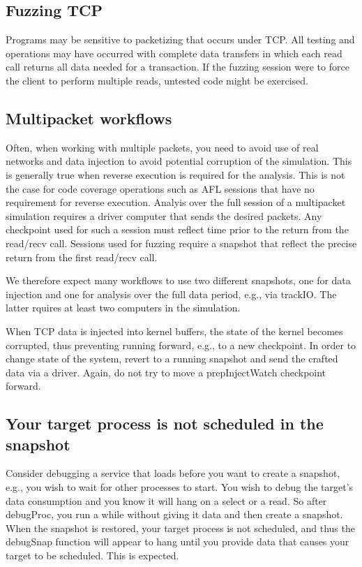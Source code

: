 \documentclass[titlepage]{article}
\begin{document}
\begin{appendices}
\subsection{Fuzzing TCP}
Programs may be sensitive to packetizing that occurs under TCP.  All testing and operations may have occurred with
complete data transfers in which each read call returns all data needed for a transaction.  If the fuzzing session
were to force the client to perform multiple reads, untested code might be exercised.

\subsection{Multipacket workflows}
Often, when working with multiple packets, you need to avoid use of real networks and data injection to avoid potential corruption of the simulation.
This is generally true when reverse execution is required for the analysis.  This is not the case for code coverage operations such as AFL sessions that
have no requirement for reverse execution.  Analyis over the full session of a multipacket simulation requires a driver computer that sends the desired
packets.  Any checkpoint used for such a session must reflect time prior to the return from the read/recv call.  Sessions used for fuzzing 
require a snapshot that reflect the precise return from the first read/recv call.  

We therefore expect many workflows to use two different snapshots, one for data injection and one for analysis over the full data period, e.g., via trackIO.
The latter rquires at least two computers in the simulation.  

When TCP data is injected into kernel buffers, the state of the kernel becomes corrupted, thus preventing running forward, e.g., to a new checkpoint.
In order to change state of the system, revert to a running snapshot and send the crafted data via a driver.  Again, do not try to move a prepInjectWatch
checkpoint forward.

\subsection{Your target process is not scheduled in the snapshot}
Consider debugging a service that loads before you want to create a snapshot, e.g., you wish to wait for other processes to start.
You wish to debug the target's data consumption and you know it will hang on a select or a read. So after debugProc, 
you run a while without giving it data and then create a snapshot.  When the snapshot
is restored, your target process is not scheduled, and thus the debugSnap function will appear to hang until you provide data that causes your
target to be scheduled.  This is expected.

\end{appendices}
\end{document}

